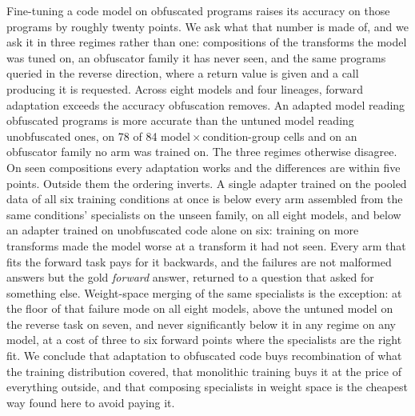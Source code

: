 Fine-tuning a code model on obfuscated programs raises its accuracy on those programs by roughly
twenty points. We ask what that number is made of, and we ask it in three regimes rather than one:
compositions of the transforms the model was tuned on, an obfuscator family it has never seen, and the
same programs queried in the reverse direction, where a return value is given and a call producing it
is requested.
Across eight models and four lineages, forward adaptation exceeds the accuracy obfuscation removes. An adapted model reading obfuscated programs is more accurate than the untuned model reading unobfuscated ones, on 78 of 84 model\,$\times$\,condition-group cells and on an obfuscator family no arm was trained on. The three regimes otherwise disagree. On seen compositions every adaptation
works and the differences are within five points. Outside them the ordering inverts. A single adapter
trained on the pooled data of all six training conditions at once is below every arm assembled from
the same conditions' specialists on the unseen family, on all eight models, and below an
adapter trained on unobfuscated code alone on six: training on more transforms made the model worse at
a transform it had not seen. Every arm that fits the forward task pays for it backwards, and the
failures are not malformed answers but the gold \emph{forward} answer, returned to a question that
asked for something else. Weight-space merging of the same specialists is the exception: at the floor
of that failure mode on all eight models, above the untuned model on the reverse task on seven, and
never significantly below it in any regime on any model, at a cost of three to six forward points
where the specialists are the right fit. We conclude that adaptation to obfuscated code buys
recombination of what the training distribution covered, that monolithic training buys it at the price
of everything outside, and that composing specialists in weight space is the cheapest way found here to
avoid paying it.
